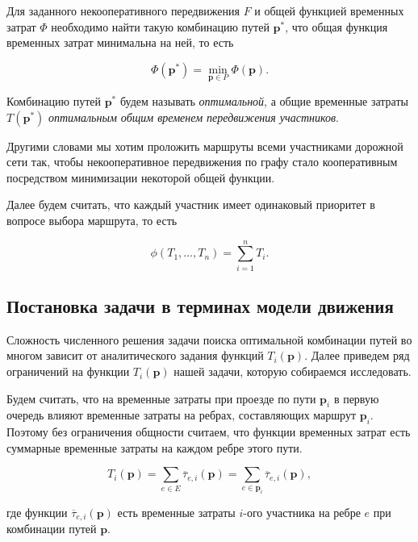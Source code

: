 \documentclass[12pt, a4paper]{article}
\DeclareMathOperator*{\minn}{min}
\begin{document}
Для заданного некооперативного передвижения $F$ и общей функцией временных затрат $\Phi$ необходимо найти такую комбинацию путей $\textbf{p}^*$, что общая функция временных затрат минимальна на ней, то есть

\begin{equation}
	\label{eq:target_global_task_T} 
	\Phi (\textbf{p}^*) = \minn\limits_{ \textbf{p} \in P} \Phi (\textbf{p}).
\end{equation}

Комбинацию путей $\textbf{p}^*$ будем называть \textit {оптимальной}, а общие временные затраты  $ T (\textbf{p}^*)$ \textit {оптимальным общим временем передвижения участников}.

Другими словами мы хотим проложить маршруты всеми участниками дорожной сети так, чтобы некооперативное передвижения по графу стало кооперативным посредством минимизации некоторой общей функции. 

Далее будем считать, что каждый участник имеет одинаковый приоритет в вопросе выбора маршрута, то есть 

\begin{equation}
\label{eq:concrete_phi} 
\phi(T_1, \ldots, T_n) = \sum\limits_{i = 1}^nT_i.
\end{equation}

\subsection{Постановка задачи в терминах модели движения}

Сложность численного решения задачи поиска оптимальной комбинации путей во многом зависит от аналитического задания функций $T_i (\textbf{p})$. Далее приведем ряд ограничений на функции $T_i (\textbf{p})$ нашей задачи, которую собираемся исследовать.

Будем считать, что на временные затраты при проезде по пути $\textbf{p}_i$ в первую очередь влияют временные затраты на ребрах, составляющих маршрут $\textbf{p}_i$. Поэтому без ограничения общности считаем, что функции временных затрат есть суммарные временные затраты на каждом ребре этого пути.

$$T_i (\textbf{p}) = \sum \limits_{e \in E} \overline{\tau}_{e, i} (\textbf{p}) = \sum \limits_{e \in \textbf{p}_i} \overline{\tau}_{e, i} (\textbf{p}), $$

где функции $\overline{\tau}_{e, i} (\textbf{p})$ есть временные затраты $i$-ого участника на ребре $e$ при комбинации путей $\textbf{p}$. 
\end{document}
